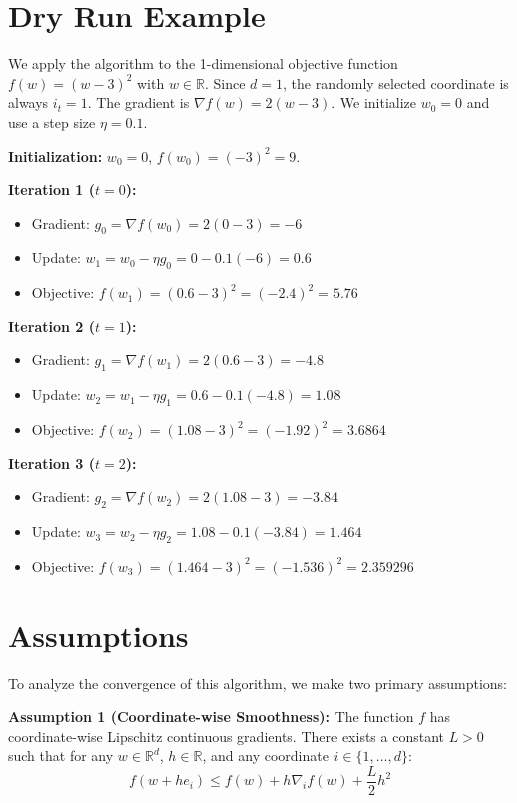 \documentclass[11pt]{article}
\begin{document}
\section*{Dry Run Example}
We apply the algorithm to the 1-dimensional objective function $f(w) = (w-3)^2$ with $w \in \mathbb{R}$. 
Since $d=1$, the randomly selected coordinate is always $i_t = 1$.
The gradient is $\nabla f(w) = 2(w-3)$. We initialize $w_0 = 0$ and use a step size $\eta = 0.1$.

\textbf{Initialization:}
$w_0 = 0$, $f(w_0) = (-3)^2 = 9$.

\textbf{Iteration 1 ($t=0$):}
\begin{itemize}
    \item Gradient: $g_0 = \nabla f(w_0) = 2(0 - 3) = -6$
    \item Update: $w_1 = w_0 - \eta g_0 = 0 - 0.1(-6) = 0.6$
    \item Objective: $f(w_1) = (0.6 - 3)^2 = (-2.4)^2 = 5.76$
\end{itemize}

\textbf{Iteration 2 ($t=1$):}
\begin{itemize}
    \item Gradient: $g_1 = \nabla f(w_1) = 2(0.6 - 3) = -4.8$
    \item Update: $w_2 = w_1 - \eta g_1 = 0.6 - 0.1(-4.8) = 1.08$
    \item Objective: $f(w_2) = (1.08 - 3)^2 = (-1.92)^2 = 3.6864$
\end{itemize}

\textbf{Iteration 3 ($t=2$):}
\begin{itemize}
    \item Gradient: $g_2 = \nabla f(w_2) = 2(1.08 - 3) = -3.84$
    \item Update: $w_3 = w_2 - \eta g_2 = 1.08 - 0.1(-3.84) = 1.464$
    \item Objective: $f(w_3) = (1.464 - 3)^2 = (-1.536)^2 = 2.359296$
\end{itemize}

\section*{Assumptions}
To analyze the convergence of this algorithm, we make two primary assumptions:

\textbf{Assumption 1 (Coordinate-wise Smoothness):} 
The function $f$ has coordinate-wise Lipschitz continuous gradients. There exists a constant $L > 0$ such that for any $w \in \mathbb{R}^d$, $h \in \mathbb{R}$, and any coordinate $i \in \{1, \dots, d\}$:
\begin{equation}
    f(w + h e_i) \leq f(w) + h \nabla_i f(w) + \frac{L}{2} h^2
\end{equation}
\end{document}

